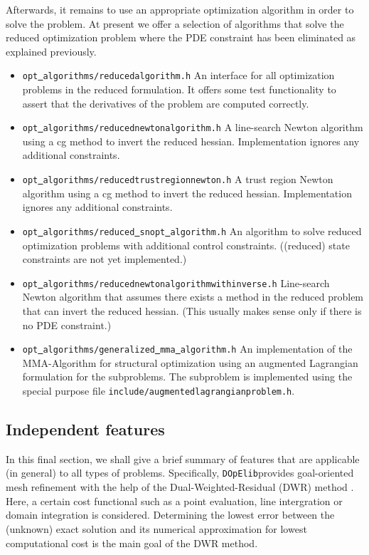 \documentclass[prodmode,acmtoms]{acmsmall}
\numberwithin{equation}{section}
\newcommand{\dope}{\texttt{DOpElib}}
\begin{document}
Afterwards, it remains to use an appropriate 
optimization algorithm in order to solve the 
problem. At present we offer a selection of algorithms that solve the reduced optimization 
problem where the PDE constraint has been eliminated as explained previously.
\begin{itemize}
\item \texttt{opt\underline{ }algorithms/reducedalgorithm.h} An interface for all 
  optimization problems in the reduced formulation. It offers some test functionality
  to assert that the derivatives of the problem are computed correctly.
\item \texttt{opt\underline{ }algorithms/reducednewtonalgorithm.h}
  A line-search Newton algorithm using a cg method to invert the reduced hessian. 
  Implementation ignores any additional constraints.
\item \texttt{opt\underline{ }algorithms/reducedtrustregionnewton.h}
  A trust region Newton algorithm using a cg method to invert the reduced hessian.
  Implementation ignores any additional constraints.
\item \texttt{opt\underline{ }algorithms/reduced\underline{ }snopt\underline{ }algorithm.h}
  An algorithm to solve reduced optimization problems with additional control constraints.
  ((reduced) state constraints are not yet implemented.)
\item \texttt{opt\underline{ }algorithms/reducednewtonalgorithmwithinverse.h}
  Line-search Newton algorithm that assumes there exists a method in the reduced problem
  that can invert the reduced hessian. (This usually makes sense only if there is no 
  PDE constraint.)
\item \texttt{opt\underline{ }algorithms/generalized\underline{ }mma\underline{ }algorithm.h}
  An implementation of the MMA-Algorithm for structural optimization using an augmented
  Lagrangian formulation for the subproblems. The subproblem is implemented using the 
  special purpose file
  \texttt{include/augmentedlagrangianproblem.h}.
\end{itemize} 




\subsection{Independent features}
In this final section, we shall give a brief summary of features 
that are applicable (in general) to all types of problems. Specifically,
\dope provides goal-oriented mesh refinement with the help of the 
Dual-Weighted-Residual (DWR) method \cite{BeRa96}. Here, a certain 
cost functional such as a point evaluation, line intergration or domain
integration is considered. Determining the lowest error between the 
(unknown) exact solution and its numerical approximation for lowest computational
cost is the main goal of the DWR method.
\end{document}
